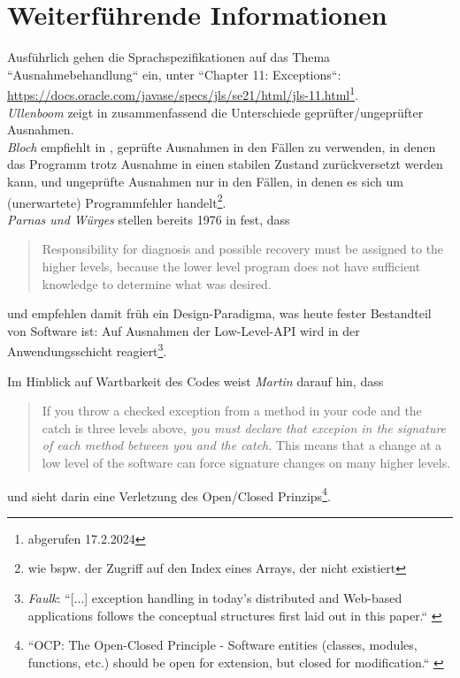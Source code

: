 \section{Weiterführende Informationen}
Ausführlich gehen die Sprachspezifikationen auf das Thema ``Ausnahmebehandlung`` ein, unter ``Chapter 11: Exceptions``: \url{https://docs.oracle.com/javase/specs/jls/se21/html/jls-11.html}\footnote{abgerufen 17.2.2024}.\\

\noindent
\textit{Ullenboom} zeigt in \cite[589, Abschnitt 9.3.9]{Ull23} zusammenfassend die Unterschiede geprüfter/ungeprüfter Ausnahmen.\\

\noindent
\textit{Bloch} empfiehlt in \cite[296]{Blo17}, geprüfte Ausnahmen in den Fällen zu verwenden, in denen das Programm trotz Ausnahme in einen stabilen Zustand zurückversetzt werden kann, und ungeprüfte Ausnahmen nur in den Fällen, in denen es sich um (unerwartete) Programmfehler handelt\footnote{wie bspw. der Zugriff auf den Index eines Arrays, der nicht existiert}.\\

\noindent
\textit{Parnas und Würges} stellen bereits 1976 in \cite{PW76} fest, dass

\blockquote[]{
Responsibility for diagnosis and possible recovery must be assigned to the higher levels, because the lower level program does not have sufficient knowledge to determine what was desired.
}

und empfehlen damit früh ein Design-Paradigma, was heute fester Bestandteil von Software ist: Auf Ausnahmen der Low-Level-API wird in der Anwendungsschicht reagiert\footnote{
\textit{Faulk}: ``[...] exception handling in today's distributed and Web-based applications follows the conceptual structures first laid out in this paper.`` \cite[229]{HW01}
}.

\noindent
Im Hinblick auf Wartbarkeit des Codes weist \textit{Martin} darauf hin, dass

\blockquote[{\cite[107, Hervorhebungen i.O.]{Mar08}}]{
If you throw a checked exception from a method in your code and the catch is three levels above, \textit{you must declare that excepion in the signature of each method between you and the catch}. This means that a change at a low level of the software can force signature changes on many higher levels.
}

und sieht darin eine Verletzung des Open/Closed Prinzips\footnote{
    ``OCP: The Open-Closed Principle - Software entities (classes, modules, functions, etc.) should be open for extension, but closed for modification.`` \cite[99]{Mar03}
}.